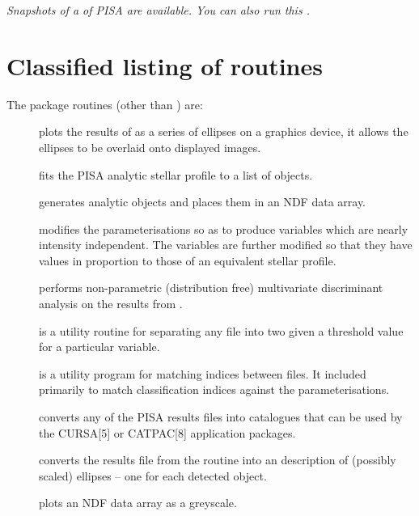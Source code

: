 \begin{htmlonly}
{\em Snapshots of a
of PISA are available. You can also run this
.}
\end{htmlonly}


\section{Classified listing of routines}

The package routines (other than ) are:
\begin{description}

\item [] plots the results of  as a
series of ellipses on a graphics device, it allows the ellipses to be
overlaid onto displayed images.

\item [] fits the PISA analytic stellar profile to a list of
objects.

\item [] generates analytic objects and places them in an NDF
data array.

\item [] modifies the  parameterisations so as to
produce variables which are nearly intensity independent. The variables
are further modified so that they have values in proportion to those of
an equivalent stellar profile.

\item [] performs non-parametric (distribution free)
multivariate discriminant analysis on the results from .

\item [] is a utility routine for separating any file
into two given a threshold value for a particular variable.

\item [] is a utility program for matching indices between
files. It included primarily to match classification indices
against the  parameterisations.

\item [] converts any of the PISA results files into
catalogues that can be used by the CURSA[5] or CATPAC[8] application
packages.

\item [] converts the results file from the
 routine into an  description of
(possibly scaled) ellipses -- one for each detected object.

\item [] plots an NDF data array as a greyscale.
\end{description}

